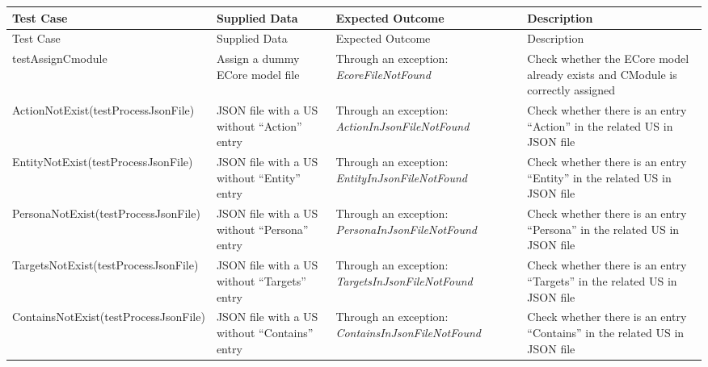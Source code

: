 \thispagestyle{empty}
\begingroup
\centering
\scriptsize
\renewcommand{\arraystretch}{1,5} 
\keepXColumns
	\begin{tabularx}{\textwidth}{X  X  X  X}
	\hline
	Test Case &Supplied Data&Expected Outcome&Description\\
	\hline\hline
	\endfirsthead
	\hline
	Test Case &Supplied Data&Expected Outcome&Description\\
	\hline\hline
	\endhead
		testAssignCmodule&Assign a dummy ECore model file&Through an exception: \textit{EcoreFileNotFound}&Check whether the ECore model already exists and CModule is correctly assigned\\
		
		ActionNotExist\newline (testProcessJsonFile)&JSON file with a US without \enquote{Action} entry&Through an exception:  \textit{ActionInJsonFileNotFound}&Check whether there is an entry \enquote{Action} in the related US in JSON file\\
		
		
		EntityNotExist\newline (testProcessJsonFile)&JSON file with a US without \enquote{Entity} entry&Through an exception: \textit{EntityInJsonFileNotFound}&Check whether there is an entry \enquote{Entity} in the related US in JSON file\\
		
		PersonaNotExist\newline (testProcessJsonFile)&JSON file with a US without \enquote{Persona} entry&Through an exception: \textit{PersonaInJsonFileNotFound}&Check whether there is an entry \enquote{Persona} in the related US in JSON file\\
		
		TargetsNotExist\newline (testProcessJsonFile)&JSON file with a US without \enquote{Targets} entry&Through an exception: \textit{TargetsInJsonFileNotFound}&Check whether there is an entry \enquote{Targets} in the related US in JSON file\\
		
		ContainsNotExist\newline (testProcessJsonFile)&JSON file with a US without \enquote{Contains} entry&Through an exception: \textit{ContainsInJsonFileNotFound}&Check whether there is an entry \enquote{Contains} in the related US in JSON file\\
		

\end{tabularx}
